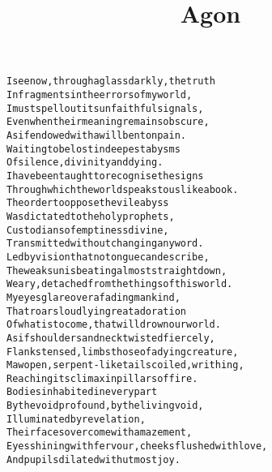 \documentclass{article}
\title{Agon}
\begin{document}
\maketitle

\clearpage

\begin{alltt}\normalfont
I see now, through a glass darkly, the truth
In fragments in the errors of my world,
I must spell out its unfaithful signals,
Even when their meaning remains obscure,
As if endowed with a will bent on pain.
Waiting to be lost in deepest abysms
Of silence, divinity and dying.
I have been taught to recognise the signs
Through which the world speaks to us like a book.
The order to oppose the vile abyss
Was dictated to the holy prophets,
Custodians of emptiness divine,
Transmitted without changing any word.
Led by vision that no tongue can describe,
The weak sun is beating almost straight down,
Weary, detached from the things of this world.
My eyes glare over a fading mankind,
That roars loudly in great adoration
Of what is to come, that will drown our world.
As if shoulders and neck twisted fiercely,
Flanks tensed, limbs those of a dying creature,
Maw open, serpent-like tails coiled, writhing,
Reaching its climax in pillars of fire.
Bodies inhabited in every part
By the void profound, by the living void,
Illuminated by revelation,
Their faces overcome with amazement,
Eyes shining with fervour, cheeks flushed with love,
And pupils dilated with utmost joy.
\end{alltt}
\end{document}
